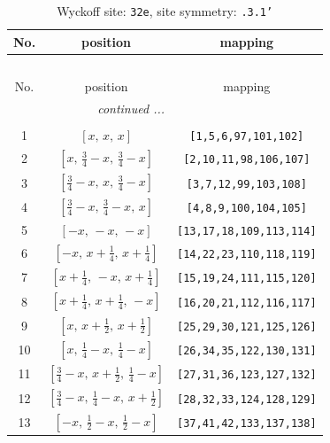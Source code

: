 \documentclass[fleqn,8pt]{jsarticle}
\begin{document}
\begin{longtable}{ccc}
\caption{Wyckoff site: {\tt 32e}, site symmetry: {\tt .3.1'}}
 \\
 \hline \hline
No. & position & mapping \\ \hline \endfirsthead

\multicolumn{2}{l}{\tablename\ \thetable{}} \\
 \hline \hline
No. & position & mapping \\ \hline \endhead

 \hline \hline
\multicolumn{2}{r}{\footnotesize\it continued ...} \\ \endfoot

 \hline \hline
\multicolumn{2}{r}{} \\ \endlastfoot

1 & $\left[ x,\, x,\, x \right]$ & {\tt [1,5,6,97,101,102]} \\ \hline
2 & $\left[ x,\, \frac{3}{4} - x,\, \frac{3}{4} - x \right]$ & {\tt [2,10,11,98,106,107]} \\ \hline
3 & $\left[ \frac{3}{4} - x,\, x,\, \frac{3}{4} - x \right]$ & {\tt [3,7,12,99,103,108]} \\ \hline
4 & $\left[ \frac{3}{4} - x,\, \frac{3}{4} - x,\, x \right]$ & {\tt [4,8,9,100,104,105]} \\ \hline
5 & $\left[ - x,\, - x,\, - x \right]$ & {\tt [13,17,18,109,113,114]} \\ \hline
6 & $\left[ - x,\, x + \frac{1}{4},\, x + \frac{1}{4} \right]$ & {\tt [14,22,23,110,118,119]} \\ \hline
7 & $\left[ x + \frac{1}{4},\, - x,\, x + \frac{1}{4} \right]$ & {\tt [15,19,24,111,115,120]} \\ \hline
8 & $\left[ x + \frac{1}{4},\, x + \frac{1}{4},\, - x \right]$ & {\tt [16,20,21,112,116,117]} \\ \hline
9 & $\left[ x,\, x + \frac{1}{2},\, x + \frac{1}{2} \right]$ & {\tt [25,29,30,121,125,126]} \\ \hline
10 & $\left[ x,\, \frac{1}{4} - x,\, \frac{1}{4} - x \right]$ & {\tt [26,34,35,122,130,131]} \\ \hline
11 & $\left[ \frac{3}{4} - x,\, x + \frac{1}{2},\, \frac{1}{4} - x \right]$ & {\tt [27,31,36,123,127,132]} \\ \hline
12 & $\left[ \frac{3}{4} - x,\, \frac{1}{4} - x,\, x + \frac{1}{2} \right]$ & {\tt [28,32,33,124,128,129]} \\ \hline
13 & $\left[ - x,\, \frac{1}{2} - x,\, \frac{1}{2} - x \right]$ & {\tt [37,41,42,133,137,138]} \\ \hline

\end{longtable}
\end{document}
